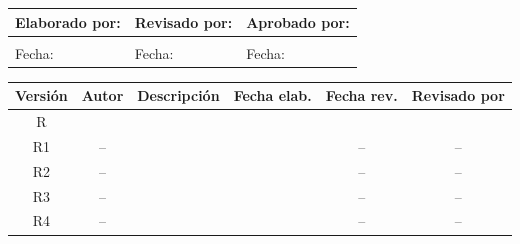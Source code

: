 \begin{titlepage}
	\thispagestyle{corporativo}

	\vspace*{1.5cm}

	\centering
	{\Large\bfseries \projecttitle}

	\vspace{3cm}

	\begin{center}
	\fontsize{10}{12}\selectfont
	\renewcommand{\arraystretch}{1.5}
	\setlength{\tabcolsep}{4pt}

	\begin{tabular}{@{}p{}p{}p{}@{}}
		\toprule
		\rowcolor{green!15}
		\textbf{Elaborado por:} & \textbf{Revisado por:} & \textbf{Aprobado por:} \\
		\midrule
		\centering\arraybackslash\vspace{1.2cm} \firmaElaboro & \centering\arraybackslash\vspace{1.2cm} \firmaReviso & \centering\arraybackslash\vspace{1.2cm} \firmaAprobo \\
		\midrule
		\centering\arraybackslash Fecha: \fechaElaboro & \centering\arraybackslash Fecha: \fechaReviso & \centering\arraybackslash Fecha: \fechaAprobo \\
		\bottomrule
	\end{tabular}
	\end{center}

	\vspace{2.5cm}

	\begin{center}
	\fontsize{10}{12}\selectfont
	\renewcommand{\arraystretch}{1.2}
	\setlength{\tabcolsep}{3pt}

	\begin{tabular}{@{}cc p{} ccc@{}}
		\toprule
		\rowcolor{green!15}
		\textbf{Versión} & \textbf{Autor} & \textbf{Descripción} & \textbf{Fecha elab.} & \textbf{Fecha rev.} & \textbf{Revisado por} \\
		\midrule
		R\docRevision & \firmaElaboro & \descRevCero & \fechaElaboro & \fechaReviso & \firmaReviso \\
		R1 & -- & \descRevUno & \fechaRevUno & -- & -- \\
		R2 & -- & \descRevDos & \fechaRevDos & -- & -- \\
		R3 & -- & \descRevTres & \fechaRevTres & -- & -- \\
		R4 & -- & \descRevCuatro & \fechaRevCuatro & -- & -- \\
		\bottomrule
	\end{tabular}
	\end{center}

	\vfill

\end{titlepage}
